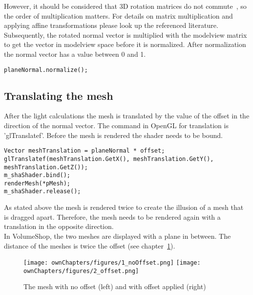 \newline
However, it should be considered that 3D rotation matrices do not commute~\cite{book:computerGraphicsHill}, so the order of multiplication matters. For details on matrix multiplication and applying affine transformations please look up the referenced literature\cite{book:computerGraphicsHearn}\cite{book:computerGraphicsHill}.
\newline
Subsequently, the rotated normal vector is multiplied with the modelview matrix to get the vector in modelview space before it is normalized. After normalization the normal vector has a value between 0 and 1.
\begin{lstlisting}
planeNormal.normalize();
\end{lstlisting}

\subsection{Translating the mesh}
After the light calculations the mesh is translated by the value of the offset in the direction of the normal vector. The command in OpenGL for translation is 'glTranslatef'. Before the mesh is rendered the shader needs to be bound.
\begin{lstlisting}
Vector meshTranslation = planeNormal * offset;
glTranslatef(meshTranslation.GetX(), meshTranslation.GetY(), meshTranslation.GetZ());
m_shaShader.bind();
renderMesh(*pMesh);
m_shaShader.release();
\end{lstlisting}
As stated above the mesh is rendered twice to create the illusion of a mesh that is dragged apart. Therefore, the mesh needs to be rendered again with a translation in the opposite direction.\\
In VolumeShop, the two meshes are displayed with a plane in between. The distance of the meshes is twice the offset (see chapter~\ref{fig:offset}).

\begin{figure}%
\centering
\texttt{[image: ownChapters/figures/1\_noOffset.png]}%
\hspace{7.00mm}
\texttt{[image: ownChapters/figures/2\_offset.png]}%
\caption{The mesh with no offset (left) and with offset applied (right)}%
\label{fig:offset}%
\end{figure}


